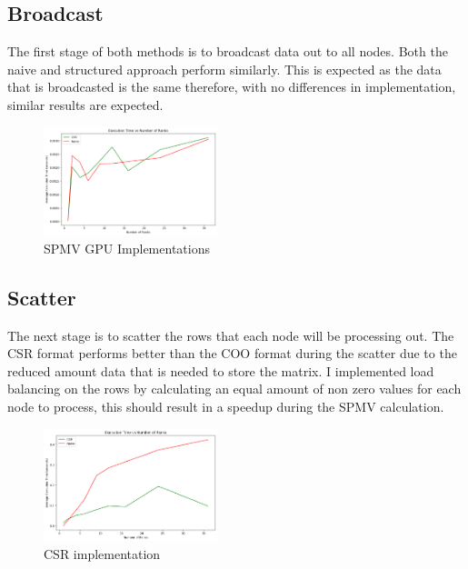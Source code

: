 \documentclass[conference]{IEEEtran}
\begin{document}
\subsection{Broadcast}
The first stage of both methods is to broadcast data out to all nodes. Both the naive and structured approach perform similarly. This is expected as the data that is broadcasted is the same therefore, with no differences in implementation, similar results are expected.
\begin{figure}[H]
    \centering
    \includegraphics[width=0.45\textwidth]{../img/broadcast.png}
    \caption{SPMV GPU Implementations}
    \label{fig:zoomed}
\end{figure}

\subsection{Scatter}
The next stage is to scatter the rows that each node will be processing out. The CSR format performs better than the COO format during the scatter due to the reduced amount data that is needed to store the matrix. I implemented load balancing on the rows by calculating an equal amount of non zero values for each node to process, this should result in a speedup during the SPMV calculation.
\begin{figure}[H]
    \centering
    \includegraphics[width=0.45\textwidth]{../img/scatter.png}
    \caption{CSR implementation}
    \label{fig:parallel}
\end{figure}
\end{document}
